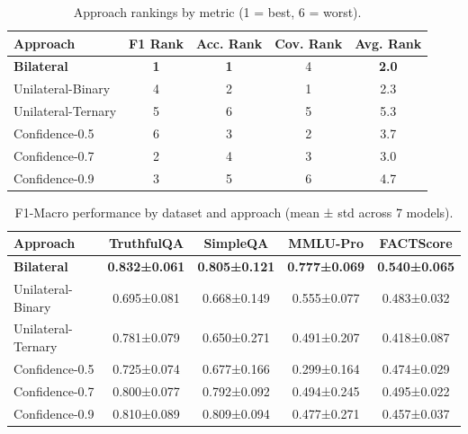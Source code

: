 \begin{table}[htbp]
\centering
\caption{Approach rankings by metric (1 = best, 6 = worst).}
\begin{tabular}{l|ccc|c}
\toprule
\textbf{Approach} & \textbf{F1 Rank} & \textbf{Acc. Rank} & \textbf{Cov. Rank} & \textbf{Avg. Rank} \\
\midrule
\textbf{Bilateral} & \textbf{1} & \textbf{1} & 4 & \textbf{2.0} \\
Unilateral-Binary & 4 & 2 & 1 & 2.3 \\
Unilateral-Ternary & 5 & 6 & 5 & 5.3 \\
Confidence-0.5 & 6 & 3 & 2 & 3.7 \\
Confidence-0.7 & 2 & 4 & 3 & 3.0 \\
Confidence-0.9 & 3 & 5 & 6 & 4.7 \\
\bottomrule
\end{tabular}
\end{table}


\begin{table}[htbp]
\centering
\caption{F1-Macro performance by dataset and approach (mean ± std across 7 models).}
\small
\begin{tabular}{l|cccc}
\toprule
\textbf{Approach} & \textbf{TruthfulQA} & \textbf{SimpleQA} & \textbf{MMLU-Pro} & \textbf{FACTScore} \\
\midrule
\textbf{Bilateral} & \textbf{0.832±0.061} & \textbf{0.805±0.121} & \textbf{0.777±0.069} & \textbf{0.540±0.065} \\
Unilateral-Binary & 0.695±0.081 & 0.668±0.149 & 0.555±0.077 & 0.483±0.032 \\
Unilateral-Ternary & 0.781±0.079 & 0.650±0.271 & 0.491±0.207 & 0.418±0.087 \\
Confidence-0.5 & 0.725±0.074 & 0.677±0.166 & 0.299±0.164 & 0.474±0.029 \\
Confidence-0.7 & 0.800±0.077 & 0.792±0.092 & 0.494±0.245 & 0.495±0.022 \\
Confidence-0.9 & 0.810±0.089 & 0.809±0.094 & 0.477±0.271 & 0.457±0.037 \\
\bottomrule
\end{tabular}
\end{table}

